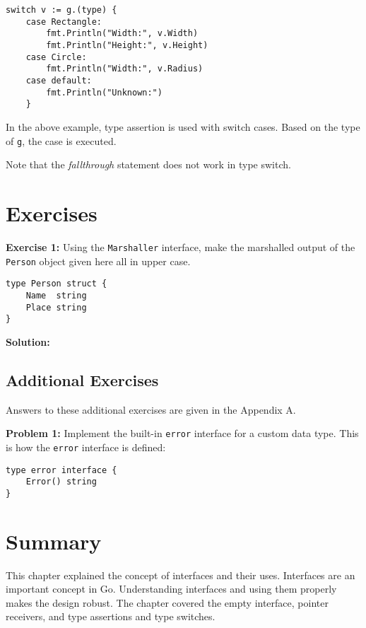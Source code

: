 \begin{lstlisting}[numbers=none]
    switch v := g.(type) {
    case Rectangle:
        fmt.Println("Width:", v.Width)
        fmt.Println("Height:", v.Height)
    case Circle:
        fmt.Println("Width:", v.Radius)
    case default:
        fmt.Println("Unknown:")
    }
\end{lstlisting}

In the above example, type assertion is used with switch cases.  Based
on the type of \texttt{g}, the case is executed.

Note that the \textit{fallthrough} statement does not work in type
switch.

\section{Exercises}

\textbf{Exercise 1:} Using the \texttt{Marshaller} interface, make the marshalled output of the
\texttt{Person} object given here all in upper case.

\begin{lstlisting}[numbers=none]
type Person struct {
    Name  string
    Place string
}
\end{lstlisting}

\textbf{Solution:}



\subsection{Additional Exercises}

Answers to these additional exercises are given in the Appendix A.

\textbf{Problem 1:} Implement the built-in \texttt{error} interface for a custom data type.
This is how the \texttt{error} interface is defined:

\begin{lstlisting}[numbers=none]
type error interface {
    Error() string
}
\end{lstlisting}


\section*{Summary}

This chapter explained the concept of interfaces and their uses. Interfaces are
an important concept in Go. Understanding interfaces and using them properly
makes the design robust. The chapter covered the empty interface, pointer
receivers, and type assertions and type switches.

